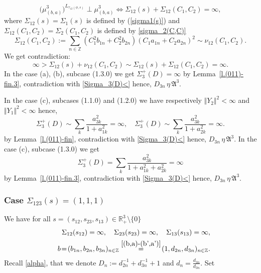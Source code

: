 \documentclass[preprint,12pt]{elsarticle}
\numberwithin{equation}{section}
\begin{document}
$$
\big(\mu_{(b,a)}^3\big)^{L_{\tau_{12}(\phi,s)}}\perp\mu_{(b,a)}^3
\Leftrightarrow 
\Sigma_{12}(s)+\Sigma_{12}(C_1,C_2)=\infty,
$$
where $\Sigma_{12}(s)=\Sigma_1(s)$ is defined by (\ref{sigma1(s)}) and
$\Sigma_{12}(C_1,C_2)=\Sigma_{2}(C_1,C_2)$ is defined by \eqref{sigma_2(C,C)} 
\begin{equation*} 
\Sigma_{12}(C_1,C_2):=
\sum_{n\in {\mathbb Z}}(C_1^2b_{1n}+C_2^2b_{2n})(C_1a_{1n}+C_2a_{2n})^2\sim\nu_{12}(C_1,C_2).
\end{equation*}
We get contradiction:
$$
\infty>\Sigma_{12}(s)+\nu_{12}(C_1,C_2)\sim
\Sigma_{12}(s)+\Sigma_{12}(C_1,C_2)=\infty.
$$
In the case (a), (b), subcase (1.3.0) we get
$\Sigma^+_3(D)=\infty$ by Lemma~\ref{l.(011)-fin.3},
contradiction with \eqref{Sigma_3(D)<}  hence, $D_{3n}\,\eta\, {\mathfrak A}^3$.


In the case (c), subcases (1.1.0) and (1.2.0) we have respectively $\Vert Y_2\Vert^2<\infty$ and $\Vert Y_1\Vert^2<\infty$ hence,
$$
\Sigma^+_3(D)\sim  \sum_k\frac{a^2_{3k}}{1
+a^2_{1k}}=\infty,\quad
\Sigma^+_3(D)\sim  \sum_k\frac{a^2_{3k}}{1
+a^2_{2k}}=\infty.
$$
by Lemma~\ref{l.(011)-fin},
contradiction with \eqref{Sigma_3(D)<}  hence, $D_{3n}\,\eta\, {\mathfrak A}^3$. In the case (c), subcase (1.3.0) we  get
\begin{equation*}
 \Sigma^+_3(D)=\sum_k\frac{a^2_{3k}}{1
+a^2_{1k}
+a^2_{2k}}=\infty
\end{equation*}
by Lemma~\ref{l.(011)-fin.3},
contradiction with \eqref{Sigma_3(D)<}  hence, $D_{3n}\,\eta\, {\mathfrak A}^3$.


\subsubsection{Case $\Sigma_{123}(s)=(1,1,1)$}
We have  for all $s=(s_{12},s_{23},s_{13})\in \mathbb R_+^3\setminus \{0\}$
\begin{eqnarray}
\label{Sigma(123)=(111)}
&&
\Sigma_{12}(s_{12})=\infty,\quad \Sigma_{23}(s_{23})=\infty,\quad\Sigma_{13}(s_{13})=\infty,\\
\nonumber
&&
  b\!=\!(b_{1n},b_{2n},b_{3n})_{n\in \mathbb Z}\stackrel{ \eqref{(b,a)-(b',a')}}{=}\!(1,d_{2n},d_{3n})_{n\in \mathbb Z}.
\end{eqnarray}
Recall \eqref{alpha}, that we denote $ D_n:=d^{-1}_{2n}+d^{-1}_{3n}+1$ and $d_n=\frac{d_{3n}}{d_{3n}}$. Set
\end{document}
